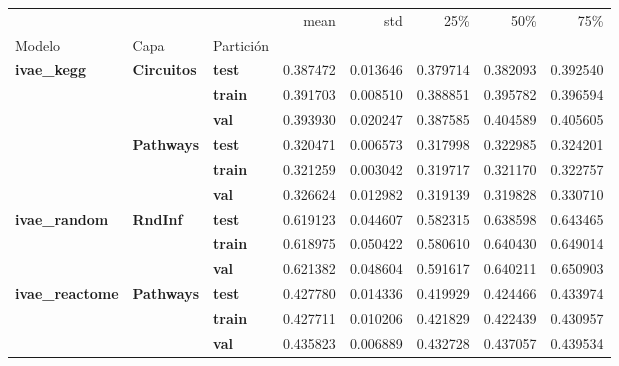 \begin{tabular}{lllrrrrr}
\toprule
 &  &  & mean & std & 25\% & 50\% & 75\% \\
Modelo & Capa & Partición &  &  &  &  &  \\
\midrule
\multirow[t]{6}{*}{\textbf{ivae\_kegg}} & \multirow[t]{3}{*}{\textbf{Circuitos}} & \textbf{test} & 0.387472 & 0.013646 & 0.379714 & 0.382093 & 0.392540 \\
\textbf{} & \textbf{} & \textbf{train} & 0.391703 & 0.008510 & 0.388851 & 0.395782 & 0.396594 \\
\textbf{} & \textbf{} & \textbf{val} & 0.393930 & 0.020247 & 0.387585 & 0.404589 & 0.405605 \\
\cline{2-8}
\textbf{} & \multirow[t]{3}{*}{\textbf{Pathways}} & \textbf{test} & 0.320471 & 0.006573 & 0.317998 & 0.322985 & 0.324201 \\
\textbf{} & \textbf{} & \textbf{train} & 0.321259 & 0.003042 & 0.319717 & 0.321170 & 0.322757 \\
\textbf{} & \textbf{} & \textbf{val} & 0.326624 & 0.012982 & 0.319139 & 0.319828 & 0.330710 \\
\cline{1-8} \cline{2-8}
\multirow[t]{3}{*}{\textbf{ivae\_random}} & \multirow[t]{3}{*}{\textbf{RndInf}} & \textbf{test} & 0.619123 & 0.044607 & 0.582315 & 0.638598 & 0.643465 \\
\textbf{} & \textbf{} & \textbf{train} & 0.618975 & 0.050422 & 0.580610 & 0.640430 & 0.649014 \\
\textbf{} & \textbf{} & \textbf{val} & 0.621382 & 0.048604 & 0.591617 & 0.640211 & 0.650903 \\
\cline{1-8} \cline{2-8}
\multirow[t]{3}{*}{\textbf{ivae\_reactome}} & \multirow[t]{3}{*}{\textbf{Pathways}} & \textbf{test} & 0.427780 & 0.014336 & 0.419929 & 0.424466 & 0.433974 \\
\textbf{} & \textbf{} & \textbf{train} & 0.427711 & 0.010206 & 0.421829 & 0.422439 & 0.430957 \\
\textbf{} & \textbf{} & \textbf{val} & 0.435823 & 0.006889 & 0.432728 & 0.437057 & 0.439534 \\
\cline{1-8} \cline{2-8}
\bottomrule
\end{tabular}
